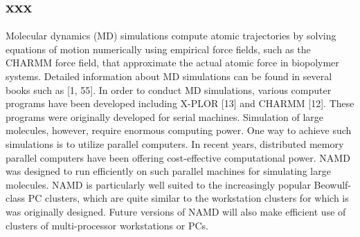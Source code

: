 \subsection{xxx}


Molecular dynamics (MD) simulations compute atomic trajectories by solving equations of motion numerically using empirical force fields, such as the CHARMM force field, that approximate the actual atomic force in biopolymer systems. Detailed information about MD simulations can be found in several books such as [1, 55]. In order to conduct MD simulations, various computer programs have been developed including X-PLOR [13] and CHARMM [12]. These programs were originally developed for serial machines. Simulation of large molecules, however, require enormous computing power. One way to achieve such simulations is to utilize parallel computers. In recent years, distributed memory parallel computers have been offering cost-effective computational power. NAMD was designed to run efficiently on such parallel machines for simulating large molecules. NAMD is particularly well suited to the increasingly popular Beowulf-class PC clusters, which are quite similar to the workstation clusters for which is was originally designed. Future versions of NAMD will also make efficient use of clusters of multi-processor workstations or PCs.

